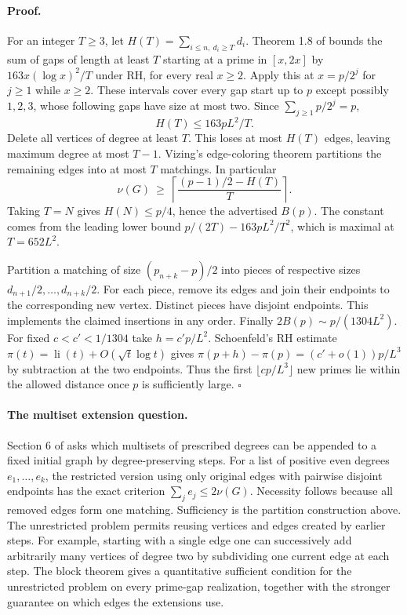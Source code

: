 \paragraph{Proof.}
For an integer $T\ge3$, let $H(T)=\sum_{i\le n,\ d_i\ge T}d_i$.
Theorem 1.8 of \cite{graphEH} bounds the sum of gaps of length at least $T$
starting at a prime in $[x,2x]$ by $163x(\log x)^2/T$ under RH,
for every real $x\ge2$. Apply this at $x=p/2^j$ for $j\ge1$ while $x\ge2$.
These intervals cover every gap start up to $p$ except possibly $1,2,3$,
whose following gaps have size at most two. Since $\sum_{j\ge1}p/2^j=p$,
\[
                  H(T)\le 163pL^2/T.                 \tag{G1}\label{eq:g1}
\]
Delete all vertices of degree at least $T$. This loses at most $H(T)$
edges, leaving maximum degree at most $T-1$. Vizing's edge-coloring
theorem partitions the remaining edges into at most $T$ matchings.
In particular
\[
 \nu(G)\ \ge\
 \left\lceil \frac{(p-1)/2-H(T)}{T}\right\rceil .    \tag{G2}\label{eq:g2}
\]
Taking $T=N$ gives $H(N)\le p/4$, hence the advertised $B(p)$.
The constant comes from the leading lower bound
$p/(2T)-163pL^2/T^2$, which is maximal at $T=652L^2$.

Partition a matching of size $(p_{n+k}-p)/2$ into pieces of respective sizes
$d_{n+1}/2,\ldots,d_{n+k}/2$. For each piece, remove its edges and join
their endpoints to the corresponding new vertex. Distinct pieces have
disjoint endpoints. This implements the claimed insertions in any order.
Finally $2B(p)\sim p/(1304L^2)$. For fixed $c<c'<1/1304$ take
$h=c'p/L^2$. Schoenfeld's RH estimate \cite[Corollary 1]{graphS}
$\pi(t)=\operatorname{li}(t)+O(\sqrt t\log t)$ gives
$\pi(p+h)-\pi(p)=(c'+o(1))p/L^3$ by subtraction at the two endpoints.
Thus the first $\lfloor c p/L^3\rfloor$ new primes lie within the allowed
distance once $p$ is sufficiently large. \hfill$\square$

\paragraph{The multiset extension question.}
Section 6 of \cite{graphDPG} asks which multisets of prescribed degrees
can be appended to a fixed initial graph by degree-preserving steps.
For a list of positive even degrees $e_1,\ldots,e_k$, the restricted
version using only original edges with pairwise disjoint endpoints has
the exact criterion $\sum_j e_j\le2\nu(G)$. Necessity follows because
all removed edges form one matching. Sufficiency is the partition
construction above. The unrestricted problem permits reusing vertices
and edges created by earlier steps. For example, starting with a single
edge one can successively add arbitrarily many vertices of degree two
by subdividing one current edge at each step. The block theorem gives
a quantitative sufficient condition for the unrestricted problem on
every prime-gap realization, together with the stronger guarantee on
which edges the extensions use.

